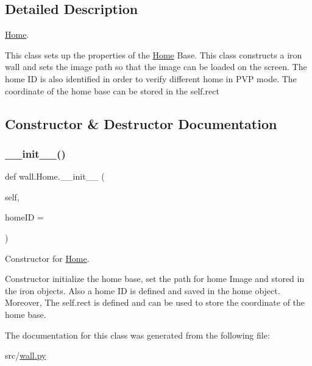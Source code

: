 \subsection{Detailed Description}
\mbox{\hyperlink{classwall_1_1_home}{Home}}. 

This class sets up the properties of the \mbox{\hyperlink{classwall_1_1_home}{Home}} Base. This class constructs a iron wall and sets the image path so that the image can be loaded on the screen. The home ID is also identified in order to verify different home in P\+VP mode. The coordinate of the home base can be stored in the self.\+rect 

\subsection{Constructor \& Destructor Documentation}
\mbox{\label{classwall_1_1_home_aaeaa84fbc29f21ffeebe4301b8a1a1fd}} 
\subsubsection{\texorpdfstring{\_\_init\_\_()}{\_\_init\_\_()}}
{\footnotesize\ttfamily def wall.\+Home.\+\_\+\+\_\+init\+\_\+\+\_\+ (\begin{DoxyParamCaption}\item[{}]{self,  }\item[{}]{home\+ID = {} }\end{DoxyParamCaption})}



Constructor for \mbox{\hyperlink{classwall_1_1_home}{Home}}. 

Constructor initialize the home base, set the path for home Image and stored in the iron objects. Also a home ID is defined and saved in the home object. Moreover, The self.\+rect is defined and can be used to store the coordinate of the home base. 

The documentation for this class was generated from the following file\+:\begin{DoxyCompactItemize}
\item 
src/\mbox{\hyperlink{wall_8py}{wall.\+py}}\end{DoxyCompactItemize}
